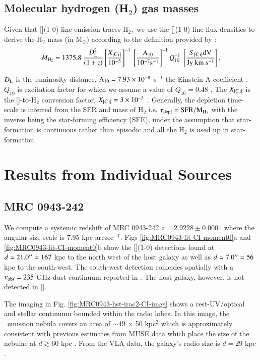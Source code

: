 \subsection{Molecular hydrogen (H$_2$) gas masses}
Given that [](1-0) line emission traces H$_2,$ we use the [](1-0) line flux densities to derive the H$_2$ mass (in M$_\odot$) according to the definition provided by \citet{PapadopoulosGreve2004}:
\begin{equation}
M_{\rm{H}_2} =  1375.8~\frac{D_{\rm L}^2}{(1+z)}\left[\frac{X_{[\ion{C}{I}]}}{10^{-5}} \right]^{-1}~ \left[ \frac{\rm{A}_{10}}{10^{-7} \rm{s}^{-1}} \right]^{-1} Q_{10}^{-1}~\left[\frac{S_{[\ion{C}{I}]}\rm{dV}}{\rm Jy~km~s^{-1}}\right].
\end{equation}

$D_{\rm L}$ is the luminosity distance, $\rm A_{10}=7.93\times 10^{-8}$ s$^{-1}$ the Einstein A-coefficient \citep{PapadopoulosGreve2004}. $Q_{10}$ is excitation factor for which we assume a value of $Q_{10}=0.48$ \citep{emonts2018}. The $X_{[\ion{C}{I}]}$ is the []-to-H$_2$ conversion factor, $X_{[\ion{C}{I}]} = 3\e{-5}$ \citep{Weiss2003}. Generally, the depletion time-scale is inferred from the SFR and mass of H$_2$ i.e. $\tau_{\rm depl} = \rm SFR/M_{H_2}$ with the inverse being the star-forming efficiency (SFE), under the assumption that star-formation is continuous rather than episodic and all the H$_2$ is used up in star-formation.

\section{Results from Individual Sources}
\subsection{MRC 0943-242}\label{section:0943}

We compute a systemic redshift of MRC 0943-242 $z=2.9228 \pm 0.0001$ where the angular-size scale is 7.95 kpc arcsec$^{-1}.$ Figs \ref{fig:MRC0943-fit-CI-moment0}a and \ref{fig:MRC0943-fit-CI-moment0}b show the [](1-0) detections found at $d\simeq21.0^{\prime\prime}=167$ kpc to the north west of the host galaxy as well as $d\simeq7.0^{\prime\prime} = 56$ kpc to the south-west. The south-west detection coincides spatially with a $\nu_{\rm obs}=235$ GHz dust continuum reported in \citet{Gullberg2016a}. The host galaxy, however, is not detected in []. 

The imaging in Fig. \ref{fig:MRC0943-hst-irac2-CI-imgs} shows a rest-UV/optical and stellar continuum bounded within the radio lobes. In this image, the \lya~emission nebula covers an area of $\sim$49 $\times$ 50 kpc$^2$ which is approximately consistent with previous estimates from MUSE data which place the size of the nebulae at $d \gtrsim 60$ kpc \citep{Gullberg2016b,Silva2018,Kolwa2019}. From the VLA data, the galaxy's radio size is $d=29$ kpc \citep{pentericci1999}. 

